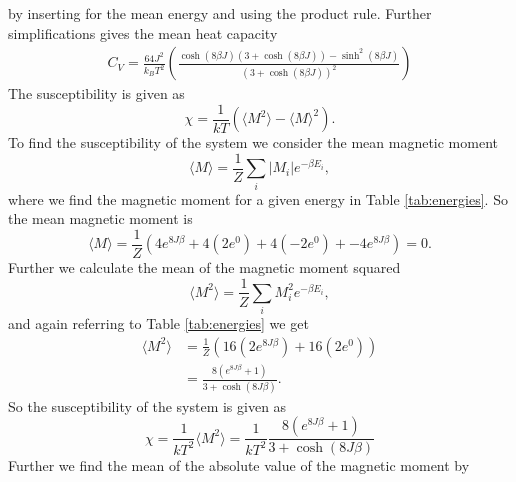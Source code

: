 \documentclass{emulateapj}
\begin{document}
%
by inserting for the mean energy and using the product rule. Further simplifications gives the mean heat capacity
%
\begin{gather*}
    C_V = \frac{64J^2}{k_B T^2} \left(\frac{\cosh(8\beta J)(3+\cosh(8 \beta J)) - \sinh^2(8\beta J)}{\left(3 + \cosh(8\beta J)\right)^2}\right)
\end{gather*}
The susceptibility is given as
%
\begin{equation*}
    \chi = \frac{1}{kT}\left(\langle M^2 \rangle - \langle M \rangle^2\right).
\end{equation*}
%
To find the susceptibility of the system we consider the mean magnetic moment
%
\begin{equation*}
    \langle M \rangle = \frac{1}{Z} \sum_i |M_i| e^{-\beta E_i},
\end{equation*}
where we find the magnetic moment for a given energy in Table \ref{tab:energies}. So the mean magnetic moment is
%
\begin{equation*}
    \langle M \rangle = \frac{1}{Z}\left(4e^{8J\beta} + 4\left(2e^{0}\right) + 4\left(-2e^0\right) + -4e^{8J\beta} \right) = 0.
\end{equation*}
%
Further we calculate the mean of the  magnetic moment squared
%
\begin{equation*}
    \langle M^2 \rangle = \frac{1}{Z}\sum_i M_i^2 e^{-\beta E_i},
\end{equation*}
and again referring to Table \ref{tab:energies} we get
%
\begin{align*}
    \langle M^2 \rangle &= \frac{1}{Z}\left(16\left(2e^{8J\beta}\right) + 16\left(2e^0\right) \right) \\
    &= \frac{8\left(e^{8J\beta} + 1\right)}{3 + \cosh\left(8J\beta\right)}.
\end{align*}
So the susceptibility of the system is given as
%
\begin{equation*}
    \chi = \frac{1}{kT^2}\langle M^2 \rangle = \frac{1}{kT^2}\frac{8\left(e^{8J\beta} + 1\right)}{3 + \cosh\left(8J\beta\right)}
\end{equation*}
%
Further we find the mean of the absolute value of the magnetic moment by
\end{document}

